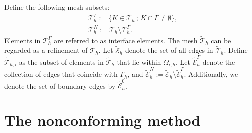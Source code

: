 \documentclass[a4paper,11pt,fleqn]{article}
\numberwithin{equation}{section}
\begin{document}
Define the following mesh subsets:
\begin{align}
	&\mathcal{T}_h^{\Gamma} := \{K \in \mathcal{T}_h \,;\, K \cap \Gamma \neq \emptyset\},\\
	&\mathcal{T}_h^N := \mathcal{T}_h \setminus \mathcal{T}_h^{\Gamma}. 
\end{align}
Elements in $\mathcal{T}_h^{\Gamma}$ are referred to as interface elements. The mesh $\widetilde{\mathcal{T}}_h$ can be regarded as a refinement of $\mathcal{T}_h$. Let $\widetilde{\mathcal{E}}_h$ denote the set of all edges in $\widetilde{\mathcal{T}}_h$. Define $\widetilde{\mathcal{T}}_{h,i}$ as the subset of elements in $\widetilde{\mathcal{T}}_h$ that lie within $\Omega_{i,h}$. Let $\widetilde{\mathcal{E}}_h^{\Gamma}$ denote the collection of edges that coincide with $\Gamma_h$, and $\widetilde{\mathcal{E}}_h^N := \widetilde{\mathcal{E}}_h \setminus \widetilde{\mathcal{E}}_{h}^{\Gamma}$. Additionally, we denote the set of boundary edges by $\widetilde{\mathcal{E}}_h^0$.


\section{The nonconforming method}\label{sec:NFEM}
\end{document}
